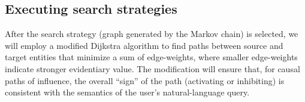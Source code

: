\documentclass[11pt,notitlepage]{article}
\begin{document}

\subsection{Executing search strategies}
\label{section:Dijkstra}
After the search strategy (graph generated by the Markov chain) is selected, we will
employ a modified Dijkstra algorithm to find paths between source and target
entities that minimize a sum of edge-weights, where smaller edge-weights
indicate stronger evidentiary value. The modification will ensure that, for
causal paths of influence, the overall ``sign'' of the path (activating or
inhibiting) is consistent with the semantics of the user's natural-language query.



\end{document}
